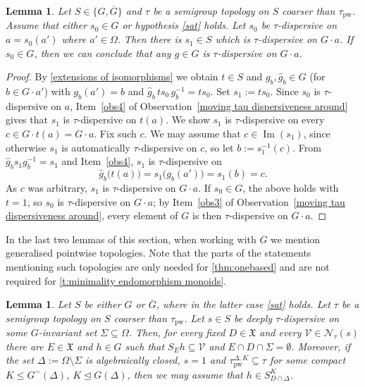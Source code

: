 \documentclass{article}
\newtheorem{lemma}[theorem]{Lemma}
\theoremstyle{remark}
\theoremstyle{definition}
\newcommand{\nn}[0]{S}%
\newcommand{\V}[0]{\mathcal{V}}
\DeclareMathOperator{\im}{Im}
\newcommand{\pw}[0]{\tau_{\mathrm{pw}}}
\newcommand{\X}[0]{\mathfrak{X}}
\renewcommand\leq{\leqslant}
\newcommand{\gc}[0]{G^{\sim}}
\begin{document}
{{{{{  \begin{lemma}\label{tau-dispersive everywhere}  Let $S\in\{G, \overline{G}\}$ and $\tau$ be a semigroup topology on $S$ coarser than $\pw$. 
  	Assume that either $s_{0}\in G$ or hypothesis \ref{sat} holds. Let $s_{0}$ be $\tau$-dispersive on $a=s_{0}(a')$ where $a'\in \Omega$. Then there is $s_{1}\in S$ which is $\tau$-dispersive on $G\cdot a$. If $s_{0}\in G$, then we can conclude that any $g\in G$ is $\tau$-dispersive on $G\cdot a$. 
  \end{lemma}
  \begin{proof}
   By \cref{extensions of isomorphisms} we obtain $t \in S$ and $g_b, \hat{g}_b \in G$
  (for $b \in G \cdot a'$) with $g_b(a') = b$ and $\hat{g}_b\, t s_0\, g_b^{-1} = t s_0$.
  Set $s_1 := t s_0$. Since $s_0$ is $\tau$-dispersive on $a$, Item~\eqref{obs4} of
  Observation~\ref{moving tau dispersiveness around} gives that $s_1$ is $\tau$-dispersive
  on $t(a)$. We show $s_1$ is $\tau$-dispersive on every $c \in G \cdot t(a) = G \cdot a$.
  Fix such $c$. We may assume that $c\in\im(s_{1})$, since otherwise $s_{1}$ is automatically $\tau$-dispersive on $c$, so let $b := s_1^{-1}(c)$. From $\hat{g}_b s_1 g_b^{-1} = s_1$ and
  Item~\eqref{obs4}, $s_1$ is $\tau$-dispersive on
  \[
    \hat{g}_b\bigl(t(a)\bigr) = s_1\bigl(g_b(a')\bigr) = s_1(b) = c.
  \]
  As $c$ was arbitrary, $s_1$ is $\tau$-dispersive on $G \cdot a$.
  If $s_0 \in G$, the above holds with $t = 1$, so $s_0$ is $\tau$-dispersive on $G \cdot a$;
  by Item~\eqref{obs3} of Observation~\ref{moving tau dispersiveness around}, every element of $G$
  is then $\tau$-dispersive on $G \cdot a$.
  \end{proof}

In the last two lemmas of this section, when working with $G$ we mention generalised pointwise topologies. Note that the parts of the statements mentioning such topologies are only needed for \cref{thm:onebased} and are not required for \cref{t:minimality endomorphism monoids}.
 


  \begin{lemma}
  	\label{l:aux} Let $S$ be either $G$ or $\overline{G}$, where in the latter case \ref{sat} holds. 
  Let $\tau$ be a semigroup topology on $S$ coarser than $\pw$. Let $s\in S$ be deeply $\tau$-dispersive on some $G$-invariant set $\Sigma\subseteq \Omega$. 
    Then, for every fixed $D\in\X$ and every $\V\in\mathcal{N}_{\tau}(s)$ there are $E\in\X$ and $h\in G$ such that $\nn_{E}h\subseteq \V$ and %
    $E\cap D\cap\Sigma=\emptyset$.  
  	Moreover, if the set $\Delta:=\Omega\setminus\Sigma$ is algebraically closed, $s=1$ and %
    {$\pw^{\Delta,K}\subseteq\tau$}
    {for some compact $K\leq \gc(\Delta)$, $K\unlhd G(\Delta)$}, then we may assume that {$h\in S^{K}_{D\cap\Delta}$}. 
  \end{lemma}
  
}}}}}
\end{document}
